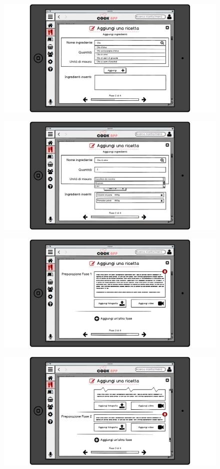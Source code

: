 \begin{figure}[H]
	\centering
	\includegraphics[width=0.95\linewidth]{img/mockup/Aggiungi-ricetta2.png}
\end{figure}
\begin{figure}[H]
	\centering
	\includegraphics[width=0.95\linewidth]{img/mockup/Aggiungi-ricetta3.png}
\end{figure}
\begin{figure}[H]
	\centering
	\includegraphics[width=0.95\linewidth]{img/mockup/Aggiungi-ricetta4.png}
\end{figure}
\begin{figure}[H]
	\centering
	\includegraphics[width=0.95\linewidth]{img/mockup/Aggiungi-ricetta5.png}
\end{figure}
